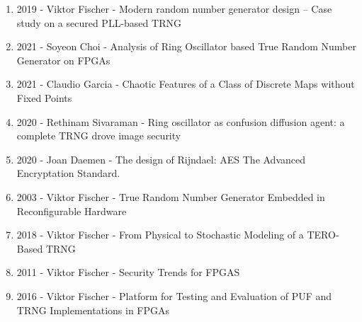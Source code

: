 \begin{enumerate}
				\item 2019 - Viktor Fischer -  Modern random number generator design – Case study on a secured PLL-based TRNG \cite{Fischer2019}
				\item 2021 - Soyeon Choi - Analysis of Ring Oscillator based True Random Number Generator on FPGAs  \cite{Choi2021}
				\item 2021 - Claudio Garcia - Chaotic Features of a Class of Discrete Maps without Fixed Points  \cite{GarciaGrimaldo2021}
				\item 2020 - Rethinam Sivaraman - Ring oscillator as confusion diffusion agent: a complete TRNG drove image security  \cite{Sivaraman2020}
				\item 2020 - Joan Daemen - The design of Rijndael: AES The Advanced Encryptation Standard.\cite{JoanDaemen2020}
				\item 2003 - Viktor Fischer - True Random Number Generator Embedded in Reconfigurable Hardware \cite{Fischer2003}	
				\item 2018 - Viktor Fischer - From Physical to Stochastic Modeling of a TERO-Based TRNG  \cite{Bernard2018}	
				\item 2011 - Viktor Fischer - Security Trends for FPGAS   \cite{Badrignans2011}
				
				\item 2016 - Viktor Fischer - Platform for Testing and Evaluation of PUF and TRNG Implementations in FPGAs   \cite{Laban2016}
			\end{enumerate}
	